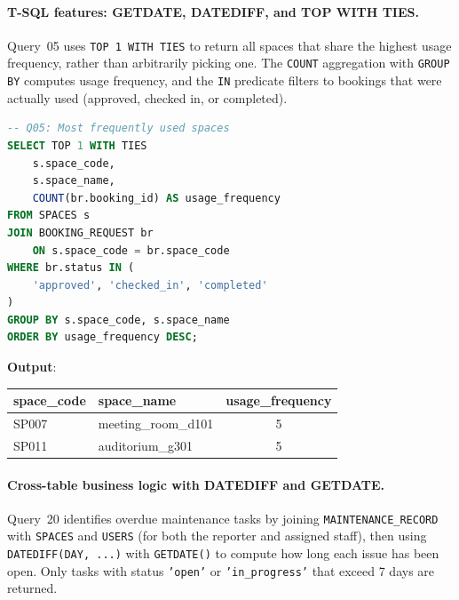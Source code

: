 \paragraph{T-SQL features: GETDATE, DATEDIFF, and TOP WITH TIES.}
Query~05 uses \texttt{TOP 1 WITH TIES} to return all spaces that share the highest usage frequency, rather than arbitrarily picking one. The \texttt{COUNT} aggregation with \texttt{GROUP BY} computes usage frequency, and the \texttt{IN} predicate filters to bookings that were actually used (approved, checked in, or completed).

\begin{lstlisting}[language=SQL]
-- Q05: Most frequently used spaces
SELECT TOP 1 WITH TIES
    s.space_code,
    s.space_name,
    COUNT(br.booking_id) AS usage_frequency
FROM SPACES s
JOIN BOOKING_REQUEST br
    ON s.space_code = br.space_code
WHERE br.status IN (
    'approved', 'checked_in', 'completed'
)
GROUP BY s.space_code, s.space_name
ORDER BY usage_frequency DESC;
\end{lstlisting}
\pagebreak
\textbf{Output}:
\begin{table}[htbp]
\centering
\begin{tabular}{|l|l|c|}
\hline
\textbf{space\_code} & \textbf{space\_name} & \textbf{usage\_frequency} \\ \hline
SP007 & meeting\_room\_d101 & 5 \\ \hline
SP011 & auditorium\_g301 & 5 \\ \hline
\end{tabular}
\end{table}
\paragraph{Cross-table business logic with DATEDIFF and GETDATE.}
Query~20 identifies overdue maintenance tasks by joining \texttt{MAINTENANCE\_RECORD} with \texttt{SPACES} and \texttt{USERS} (for both the reporter and assigned staff), then using \texttt{DATEDIFF(DAY, ...)} with \texttt{GETDATE()} to compute how long each issue has been open. Only tasks with status \texttt{'open'} or \texttt{'in\_progress'} that exceed 7 days are returned.

